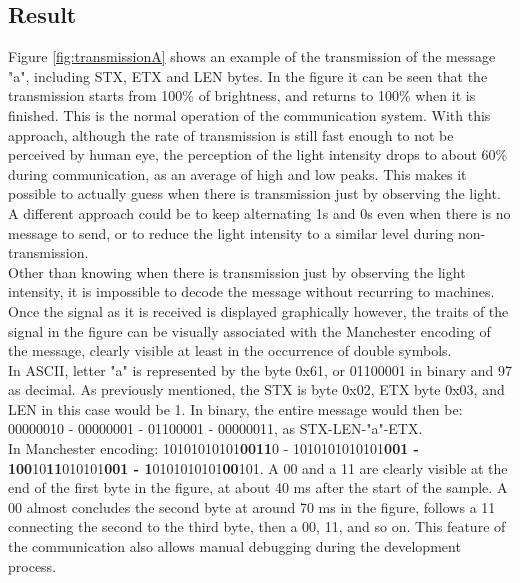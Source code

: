 \subsection{Result}
Figure \ref{fig:transmissionA} shows an example of the transmission of the message "a", including STX, ETX and LEN bytes.
In the figure it can be seen that the transmission starts from 100\% of brightness, and returns to 100\% when it is finished. 
This is the normal operation of the communication system.
With this approach, although the rate of transmission is still fast enough to not be perceived by human eye, the perception of the light intensity drops to about 60\% during communication, as an average of high and low peaks.
This makes it possible to actually guess when there is transmission just by observing the light.
A different approach could be to keep alternating 1s and 0s even when there is no message to send, or to reduce the light intensity to a similar level during non-transmission.\\
Other than knowing when there is transmission just by observing the light intensity, it is impossible to decode the message without recurring to machines.
Once the signal as it is received is displayed graphically however, the traits of the signal in the figure can be visually associated with the Manchester encoding of the message, clearly visible at least in the occurrence of double symbols. \\
In ASCII, letter "a" is represented by the byte 0x61, or 01100001 in binary and 97 as decimal.
As previously mentioned, the STX is byte 0x02, ETX byte 0x03, and LEN in this case would be 1.
In binary, the entire message would then be: 00000010 - 00000001 - 01100001 - 00000011, as STX-LEN-"a"-ETX.\\
In Manchester encoding: 10101010101\textbf{0011}0 - 1010101010101\textbf{001 - 100}10\textbf{11}010101\textbf{001 - 1}0101010101\textbf{00}101.
A 00 and a 11 are clearly visible at the end of the first byte in the figure, at about 40 ms after the start of the sample.
 A 00 almost concludes the second byte at around 70 ms in the figure, follows a 11 connecting the second to the third byte, then a 00, 11, and so on.
 This feature of the communication also allows manual debugging during the development process.

